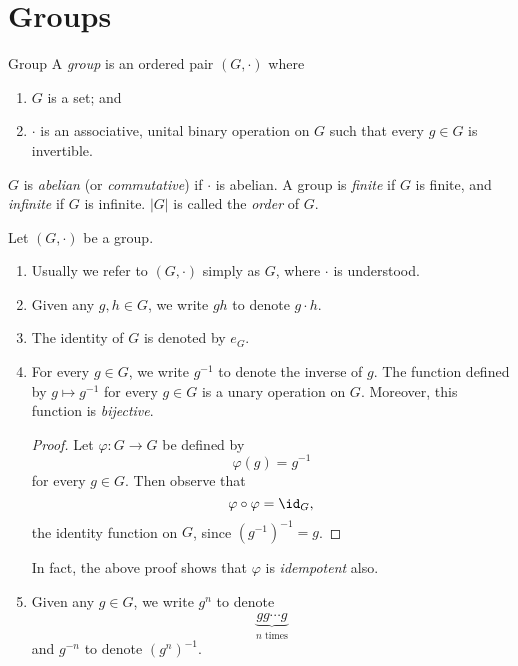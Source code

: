 \documentclass[pmath347]{subfiles}
\begin{document}

    \section{Groups}

    \begin{definition}{Group}{}
        A \emph{group} is an ordered pair $\left( G,\cdot \right)$ where
        \begin{enumerate}
            \item $G$ is a set; and
            \item $\cdot$ is an associative, unital binary operation on $G$ such that every $g\in G$ is invertible.
        \end{enumerate}
        $G$ is \emph{abelian} (or \emph{commutative}) if $\cdot$ is abelian. A group is \emph{finite} if $G$ is finite, and \emph{infinite} if $G$ is infinite. $\left| G \right|$ is called the \emph{order} of $G$.
    \end{definition}

    \np[Notations]Let $\left( G,\cdot \right)$ be a group.
    \begin{enumerate}
        \item Usually we refer to $\left( G,\cdot \right)$ simply as $G$, where $\cdot$ is understood. 
        \item Given any $g,h\in G$, we write $gh$ to denote $g\cdot h$. 
        \item The identity of $G$ is denoted by $e_G$. 
        \item For every $g\in G$, we write $g^{-1} $ to denote the inverse of $g$. The function defined by $g\mapsto g^{-1} $ for every $g\in G$ is a unary operation on $G$. Moreover, this function is \textit{bijective}.

            \begin{proof}
                Let $\varphi:G\to G$ be defined by
                \begin{equation*}
                    \varphi\left( g \right) = g^{-1} 
                \end{equation*}
                for every $g\in G$. Then observe that
                \begin{equation*}
                    \varphi\circ\varphi = \id_G,
                \end{equation*}
                the identity function on $G$, since $\left( g^{-1}  \right) ^{-1}  = g$. 
            \end{proof}
            In fact, the above proof shows that $\varphi$ is \textit{idempotent} also.
        \item Given any $g\in G$, we write $g^n$ to denote
            \begin{equation*}
                \underbrace{gg\cdots g}_{n\text{ times}}
            \end{equation*}
            and $g^{-n}$ to denote $\left( g^n \right) ^{-1} $.
    \end{enumerate}
\end{document}
